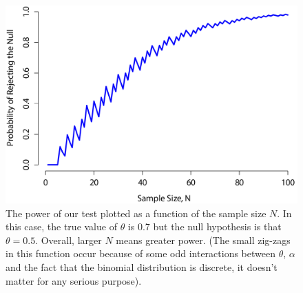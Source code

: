 \documentclass[
]{book}
\begin{document}
\begin{figure}

{\centering \includegraphics[width=1\linewidth]{img/nhst/powerN} 

}

\caption{The power of our test plotted as a function of the sample size $N$. In this case, the true value of $\theta$ is 0.7 but the null hypothesis is that $\theta = 0.5$. Overall, larger $N$ means greater power. (The small zig-zags in this function occur because of some odd interactions between $\theta$, $\alpha$ and the fact that the binomial distribution is discrete, it doesn't matter for any serious purpose).}\label{fig:powerfunctionsample}
\end{figure}
\end{document}
